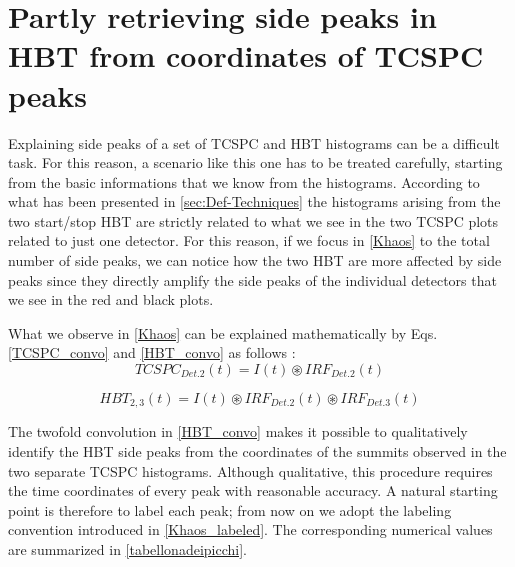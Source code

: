 \section{Partly retrieving side peaks in HBT from coordinates of TCSPC peaks}
\label{cpp:Reconstructsides}
Explaining side peaks of a set of TCSPC and HBT histograms can be a difficult task. 
For this reason, a scenario like this one has to be treated carefully, starting from the basic informations that we know from the histograms.
According to what has been presented in \autoref{sec:Def-Techniques} the histograms arising from the two start/stop HBT  are strictly related to what we see in the two TCSPC plots related to just one detector.
For this reason, if we focus in \autoref{Khaos} to the total number of side peaks, we can notice how the two HBT are more affected by side peaks since they directly amplify the side peaks of the individual detectors that we see in the red and black plots. %

What we observe in \autoref{Khaos} can be explained mathematically by Eqs.~ \ref{TCSPC_convo} and \ref{HBT_convo} as follows :
\begin{equation}
TCSPC_{Det.2}(t) = I(t) \circledast IRF_{Det.2}(t)
\label{TCSPC_convo}
\end{equation}

\begin{equation}
HBT_{2,3}(t) = I(t) \circledast IRF_{Det.2}(t) \circledast IRF_{Det.3}(t)
\label{HBT_convo}
\end{equation}

The twofold convolution in \autoref{HBT_convo} makes it possible to qualitatively identify the HBT side peaks from the coordinates of the summits observed in the two separate TCSPC histograms.
Although qualitative, this procedure requires the time coordinates of every peak with reasonable accuracy.
A natural starting point is therefore to label each peak; from now on we adopt the labeling convention introduced in \autoref{Khaos_labeled}.
The corresponding numerical values are summarized in \autoref{tabellonadeipicchi}.

